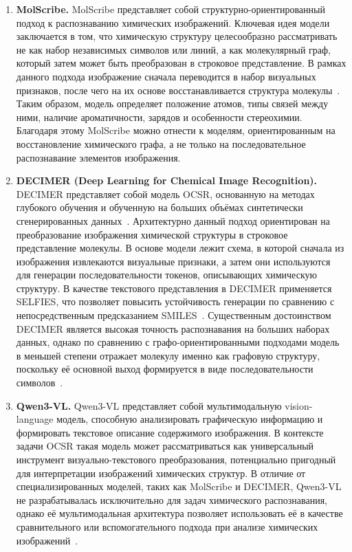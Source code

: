 \begin{enumerate}
	\item \textbf{MolScribe.}  
	MolScribe представляет собой структурно-ориентированный подход к распознаванию химических изображений. Ключевая идея модели заключается в том, что химическую структуру целесообразно рассматривать не как набор независимых символов или линий, а как молекулярный граф, который затем может быть преобразован в строковое представление. В рамках данного подхода изображение сначала переводится в набор визуальных признаков, после чего на их основе восстанавливается структура молекулы~\cite{refMolScribe}. Таким образом, модель определяет положение атомов, типы связей между ними, наличие ароматичности, зарядов и особенности стереохимии. Благодаря этому MolScribe можно отнести к моделям, ориентированным на восстановление химического графа, а не только на последовательное распознавание элементов изображения.
	
	\item \textbf{DECIMER (Deep Learning for Chemical Image Recognition).}  
	DECIMER представляет собой модель OCSR, основанную на методах глубокого обучения и обученную на больших объёмах синтетически сгенерированных данных~\cite{refDECIMER}. Архитектурно данный подход ориентирован на преобразование изображения химической структуры в строковое представление молекулы. В основе модели лежит схема, в которой сначала из изображения извлекаются визуальные признаки, а затем они используются для генерации последовательности токенов, описывающих химическую структуру. В качестве текстового представления в DECIMER применяется SELFIES, что позволяет повысить устойчивость генерации по сравнению с непосредственным предсказанием SMILES~\cite{refDECIMERJournal}. Существенным достоинством DECIMER является высокая точность распознавания на больших наборах данных, однако по сравнению с графо-ориентированными подходами модель в меньшей степени отражает молекулу именно как графовую структуру, поскольку её основной выход формируется в виде последовательности символов~\cite{refDECIMERJournal}.
	
	\item \textbf{Qwen3-VL.}  
	Qwen3-VL представляет собой мультимодальную vision-language модель, способную анализировать графическую информацию и формировать текстовое описание содержимого изображения. В контексте задачи OCSR такая модель может рассматриваться как универсальный инструмент визуально-текстового преобразования, потенциально пригодный для интерпретации изображений химических структур. В отличие от специализированных моделей, таких как MolScribe и DECIMER, Qwen3-VL не разрабатывалась исключительно для задач химического распознавания, однако её мультимодальная архитектура позволяет использовать её в качестве сравнительного или вспомогательного подхода при анализе химических изображений~\cite{refQwen3VL}.
\end{enumerate}

